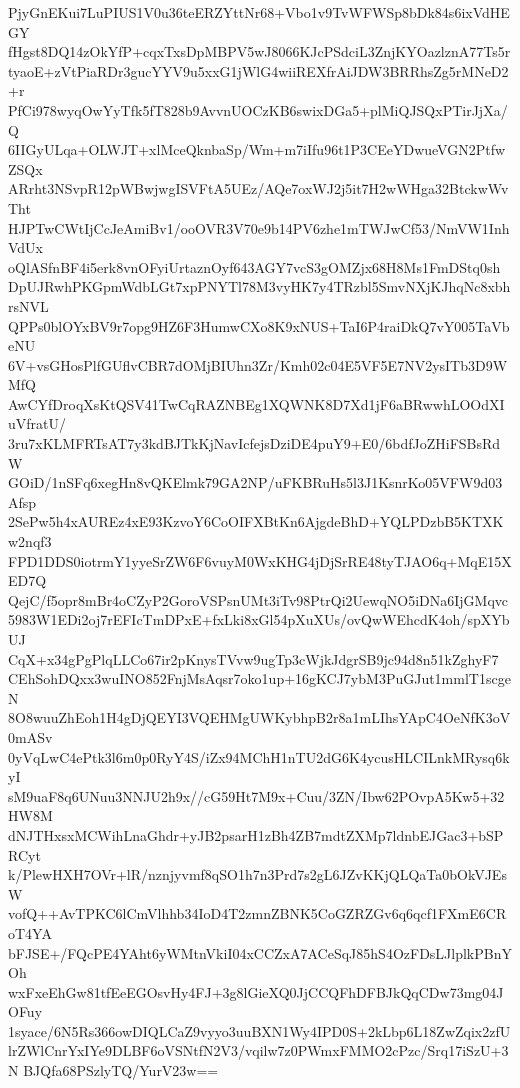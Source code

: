 PjyGnEKui7LuPIUS1V0u36teERZYttNr68+Vbo1v9TvWFWSp8bDk84s6ixVdHEGY
fHgst8DQ14zOkYfP+cqxTxsDpMBPV5wJ8066KJcPSdciL3ZnjKYOazlznA77Ts5r
tyaoE+zVtPiaRDr3gucYYV9u5xxG1jWlG4wiiREXfrAiJDW3BRRhsZg5rMNeD2+r
PfCi978wyqOwYyTfk5fT828b9AvvnUOCzKB6swixDGa5+plMiQJSQxPTirJjXa/Q
6IIGyULqa+OLWJT+xlMceQknbaSp/Wm+m7iIfu96t1P3CEeYDwueVGN2PtfwZSQx
ARrht3NSvpR12pWBwjwgISVFtA5UEz/AQe7oxWJ2j5it7H2wWHga32BtckwWvTht
HJPTwCWtIjCcJeAmiBv1/ooOVR3V70e9b14PV6zhe1mTWJwCf53/NmVW1InhVdUx
oQlASfnBF4i5erk8vnOFyiUrtaznOyf643AGY7vcS3gOMZjx68H8Ms1FmDStq0sh
DpUJRwhPKGpmWdbLGt7xpPNYTl78M3vyHK7y4TRzbl5SmvNXjKJhqNc8xbhrsNVL
QPPs0blOYxBV9r7opg9HZ6F3HumwCXo8K9xNUS+TaI6P4raiDkQ7vY005TaVbeNU
6V+vsGHosPlfGUflvCBR7dOMjBIUhn3Zr/Kmh02c04E5VF5E7NV2ysITb3D9WMfQ
AwCYfDroqXsKtQSV41TwCqRAZNBEg1XQWNK8D7Xd1jF6aBRwwhLOOdXIuVfratU/
3ru7xKLMFRTsAT7y3kdBJTkKjNavIcfejsDziDE4puY9+E0/6bdfJoZHiFSBsRdW
GOiD/1nSFq6xegHn8vQKElmk79GA2NP/uFKBRuHs5l3J1KsnrKo05VFW9d03Afsp
2SePw5h4xAUREz4xE93KzvoY6CoOIFXBtKn6AjgdeBhD+YQLPDzbB5KTXKw2nqf3
FPD1DDS0iotrmY1yyeSrZW6F6vuyM0WxKHG4jDjSrRE48tyTJAO6q+MqE15XED7Q
QejC/f5opr8mBr4oCZyP2GoroVSPsnUMt3iTv98PtrQi2UewqNO5iDNa6IjGMqvc
5983W1EDi2oj7rEFIcTmDPxE+fxLki8xGl54pXuXUs/ovQwWEhcdK4oh/spXYbUJ
CqX+x34gPgPlqLLCo67ir2pKnysTVvw9ugTp3cWjkJdgrSB9jc94d8n51kZghyF7
CEhSohDQxx3wuINO852FnjMsAqsr7oko1up+16gKCJ7ybM3PuGJut1mmlT1scgeN
8O8wuuZhEoh1H4gDjQEYI3VQEHMgUWKybhpB2r8a1mLIhsYApC4OeNfK3oV0mASv
0yVqLwC4ePtk3l6m0p0RyY4S/iZx94MChH1nTU2dG6K4ycusHLCILnkMRysq6kyI
sM9uaF8q6UNuu3NNJU2h9x//cG59Ht7M9x+Cuu/3ZN/Ibw62POvpA5Kw5+32HW8M
dNJTHxsxMCWihLnaGhdr+yJB2psarH1zBh4ZB7mdtZXMp7ldnbEJGac3+bSPRCyt
k/PlewHXH7OVr+lR/nznjyvmf8qSO1h7n3Prd7s2gL6JZvKKjQLQaTa0bOkVJEsW
vofQ++AvTPKC6lCmVlhhb34IoD4T2zmnZBNK5CoGZRZGv6q6qcf1FXmE6CRoT4YA
bFJSE+/FQcPE4YAht6yWMtnVkiI04xCCZxA7ACeSqJ85hS4OzFDsLJlplkPBnYOh
wxFxeEhGw81tfEeEGOsvHy4FJ+3g8lGieXQ0JjCCQFhDFBJkQqCDw73mg04JOFuy
1syace/6N5Rs366owDIQLCaZ9vyyo3uuBXN1Wy4IPD0S+2kLbp6L18ZwZqix2zfU
lrZWlCnrYxIYe9DLBF6oVSNtfN2V3/vqilw7z0PWmxFMMO2cPzc/Srq17iSzU+3N
BJQfa68PSzlyTQ/YurV23w==
